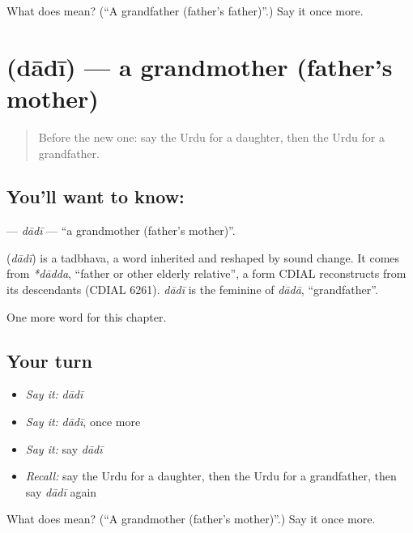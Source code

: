 \begin{tcolorbox}[breakable,colback=teal!4,colframe=teal!35!black,title={Before you move on}]
What does  mean? (\textquotedblleft{}A grandfather (father's father)\textquotedblright{}.) Say it once more.
\end{tcolorbox}
\section[\texorpdfstring{\ur{دادی} (dādī)}{دادی (dādī)}]{ (dādī) — a grandmother (father's mother)}

\label{lesson:UR-C43-dadi}



\begin{quote}
Before the new one: say the Urdu for a daughter, then the Urdu for a grandfather.
\end{quote}

\subsection*{You'll want to know: }
\textbf{} — \emph{dādī} — \textquotedblleft{}a grandmother (father's mother)\textquotedblright{}.

\begin{cousinweb}
\textbf{} (\emph{dādī}) is a tadbhava, a word inherited and reshaped by sound change. It comes from \emph{*dādda}, \textquotedblleft{}father or other elderly relative\textquotedblright{}, a form CDIAL reconstructs from its descendants (CDIAL 6261). \emph{dādī} is the feminine of \emph{dādā}, \textquotedblleft{}grandfather\textquotedblright{}.
\end{cousinweb}

\begin{grammarlens}[title={What you've built}]
One more word for this chapter.
\end{grammarlens}

\subsection*{Your turn}
\begin{itemize}
\raggedright
  \item \emph{Say it:} \emph{dādī}
  \item \emph{Say it:} \emph{dādī}, once more
  \item \emph{Say it:} say \emph{dādī}
  \item \emph{Recall:} say the Urdu for a daughter, then the Urdu for a grandfather, then say \emph{dādī} again
\end{itemize}

\begin{tcolorbox}[breakable,colback=teal!4,colframe=teal!35!black,title={Before you move on}]
What does  mean? (\textquotedblleft{}A grandmother (father's mother)\textquotedblright{}.) Say it once more.
\end{tcolorbox}
